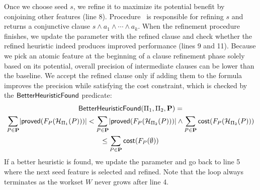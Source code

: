 Once we choose seed $s$, we refine it to maximize its potential benefit by conjoining other
features (line 8). Procedure \RefineSeed~is responsible for refining
$s$ and returns a conjunctive clause $s \land a_1 \land \cdots \land a_k$.
When the refinement procedure finishes, we update the parameter with the
refined clause and check whether the refined heuristic
indeed produces improved performance (lines 9 and 11).
Because we pick an atomic feature at the beginning of a clause
refinement phase solely based on its potential, overall precision of
intermediate clauses can be lower than the baseline. We accept the
refined clause only if adding them to the formula
improves the precision while satisfying the cost constraint, which is
checked by the ${\sf BetterHeuristicFound}$ predicate:
\begin{multline*}
{\sf BetterHeuristicFound}(\Pi_1, \Pi_2, \mathbf{P})=\\ \sum_{P \in \mathbf{P}}\lvert{\sf proved}(F_P(\mathcal{H}_{\Pi_1}(P)))\rvert < \sum_{P \in \mathbf{P}}\lvert{\sf proved}(F_P(\mathcal{H}_{\Pi_2}(P)))\rvert \land \sum_{P \in \mathbf{P}}{\sf cost}(F_P(\mathcal{H}_{\Pi_2}(P))) \\ \le \sum_{P \in \mathbf{P}}{\sf cost}(F_P(\emptyset))
\end{multline*}
If a better heuristic is found, we update the parameter
and go back to line 5 where the next seed feature is selected and
refined.
Note that the loop always terminates as the
workset $W$ never grows after line 4.



